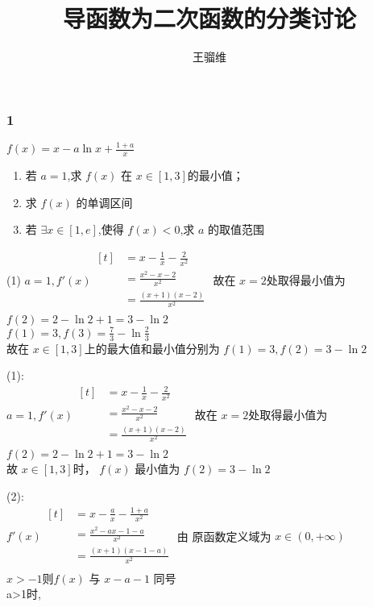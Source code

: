 \documentclass{ctexbeamer}
\begin{document}
\title{导函数为二次函数的分类讨论}
\author{王骝维}

\frame{\titlepage}

\frametitle{1}
\begin{frame}

    $f(x)=x-a\ln{x}+\frac{1+a}{x}$
    \begin{enumerate}[label=(\arabic*)]
        \item   若 $a=1$,求 $f(x)$ 在 $x \in [1,3]$的最小值；
        \item   求 $f(x)$ 的单调区间
        \item   若 $\exists x \in [1,e]$,使得 $f(x)<0$,求 $a$ 的取值范围
    \end{enumerate}

\end{frame}

\begin{frame}
    (1) $a=1,f'(x)
        \begin{aligned}[t]
             & =x-\frac{1}{x}-\frac{2}{x^2} \\
             & =\frac{x^2-x-2}{x^2}         \\
             & =\frac{(x+1)(x-2)}{x^2}      \\
        \end{aligned}$
    故在 $x=2$处取得最小值为 $f(2)=2-\ln{2}+1=3-\ln{2}$\\
    $f(1)=3,f(3)=\frac{7}{3}-\ln{\frac{2}{3}}$\\
    故在 $x \in [1,3]$上的最大值和最小值分别为 $f(1)=3,f(2)=3-\ln{2}$
\end{frame}


\begin{frame}
    (1):\\
    $a=1,f'(x)
        \begin{aligned}[t]
             & =x-\frac{1}{x}-\frac{2}{x^2} \\
             & =\frac{x^2-x-2}{x^2}         \\
             & =\frac{(x+1)(x-2)}{x^2}      \\
        \end{aligned}$
    故在 $x=2$处取得最小值为 $f(2)=2-\ln{2}+1=3-\ln{2}$\\
    故 $x \in [1,3]$时， $f(x)$ 最小值为 $f(2)=3-\ln{2}$
\end{frame}

\begin{frame}
    (2):\\
    $f'(x)
        \begin{aligned}[t]
             & =x-\frac{a}{x}-\frac{1+a}{x^2} \\
             & =\frac{x^2-ax-1-a}{x^2}        \\
             & =\frac{(x+1)(x-1-a)}{x^2}      \\
        \end{aligned}$
    由 原函数定义域为 $x\in(0,+\infty)$\\
    $x>-1$则$ f(x)$ 与 $x-a-1$ 同号\\
    a>1时,
\end{frame}
\end{document}
